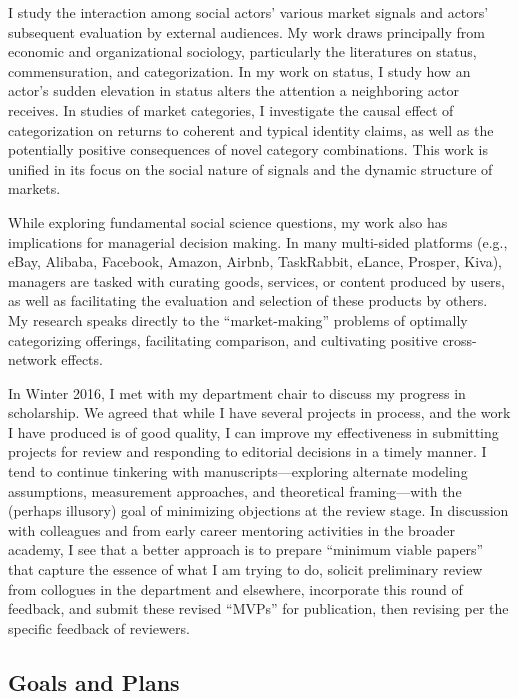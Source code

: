 \documentclass[11pt,article,oneside]{memoir}
\begin{document}
I study the interaction among social actors' various market signals and
actors' subsequent evaluation by external audiences. My work draws
principally from economic and organizational sociology, particularly the
literatures on status, commensuration, and categorization. In my work on
status, I study how an actor's sudden elevation in status alters the
attention a neighboring actor receives. In studies of market categories,
I investigate the causal effect of categorization on returns to coherent
and typical identity claims, as well as the potentially positive
consequences of novel category combinations. This work is unified in its
focus on the social nature of signals and the dynamic structure of
markets.

While exploring fundamental social science questions, my work also has
implications for managerial decision making. In many multi-sided
platforms (e.g., eBay, Alibaba, Facebook, Amazon, Airbnb, TaskRabbit,
eLance, Prosper, Kiva), managers are tasked with curating goods,
services, or content produced by users, as well as facilitating the
evaluation and selection of these products by others. My research speaks
directly to the \enquote{market-making} problems of optimally
categorizing offerings, facilitating comparison, and cultivating
positive cross-network effects.

In Winter 2016, I met with my department chair to discuss my progress in
scholarship. We agreed that while I have several projects in process,
and the work I have produced is of good quality, I can improve my
effectiveness in submitting projects for review and responding to
editorial decisions in a timely manner. I tend to continue tinkering
with manuscripts---exploring alternate modeling assumptions, measurement
approaches, and theoretical framing---with the (perhaps illusory) goal
of minimizing objections at the review stage. In discussion with
colleagues and from early career mentoring activities in the broader
academy, I see that a better approach is to prepare \enquote{minimum
viable papers} that capture the essence of what I am trying to do,
solicit preliminary review from collogues in the department and
elsewhere, incorporate this round of feedback, and submit these revised
\enquote{MVPs} for publication, then revising per the specific feedback
of reviewers.

\subsection{Goals and Plans}\label{goals-and-plans}
\end{document}

